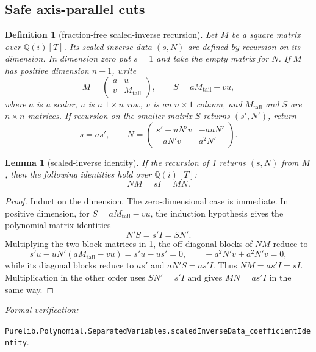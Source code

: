 \documentclass[11pt]{article}
\newtheorem{lemma}[theorem]{Lemma}
\newtheorem{definition}[theorem]{Definition}
\newcommand{\Qi}{\mathbb{Q}(i)}
\newcommand{\leanref}[1]{\par\smallskip\noindent
  \emph{Formal verification:}\par\nobreak
  {\raggedright\nolinkurl{#1}.\par}}
\begin{document}
\subsection{Safe axis-parallel cuts}

\begin{definition}[fraction-free scaled-inverse recursion]
\label{def:fraction-free-scaled-inverse}
Let $M$ be a square matrix over $\Qi[T]$.  Its scaled-inverse data $(s,N)$
are defined by recursion on its dimension.  In dimension zero put $s=1$ and
take the empty matrix for $N$.  If $M$ has positive dimension $n+1$, write
\[
 M=\begin{pmatrix}a&u\\ v&M_{\mathrm{tail}}\end{pmatrix},
 \qquad S=aM_{\mathrm{tail}}-vu,
\]
where $a$ is a scalar, $u$ is a $1\times n$ row, $v$ is an $n\times1$
column, and $M_{\mathrm{tail}}$ and $S$ are $n\times n$ matrices.  If
recursion on the smaller matrix $S$ returns $(s',N')$, return
\[
 s=as',\qquad
 N=\begin{pmatrix}
      s'+uN'v&-auN'\\
      -aN'v&a^2N'
    \end{pmatrix}.
\]
\end{definition}

\begin{lemma}[scaled-inverse identity]
\label{lem:scaled-inverse-identity}
If the recursion of \cref{def:fraction-free-scaled-inverse} returns $(s,N)$
from $M$, then the following identities hold over $\Qi[T]$:
\[
                         NM=sI=MN.
\]
\end{lemma}

\begin{proof}
Induct on the dimension.  The zero-dimensional case is immediate.  In
positive dimension, for $S=aM_{\mathrm{tail}}-vu$, the induction hypothesis
gives the polynomial-matrix identities
\[
                 N'S=s'I=SN'.
\]
Multiplying the two block matrices in
\cref{def:fraction-free-scaled-inverse}, the off-diagonal blocks of $NM$
reduce to
\[
 s'u-uN'(aM_{\mathrm{tail}}-vu)=s'u-us'=0,
 \qquad -a^2N'v+a^2N'v=0,
\]
while its diagonal blocks reduce to $as'$ and $aN'S=as'I$.
Thus $NM=as'I=sI$.  Multiplication in the other order uses $SN'=s'I$ and
gives $MN=as'I$ in the same way.
\end{proof}

\leanref{Purelib.Polynomial.SeparatedVariables.scaledInverseData_coefficientIdentity}
\end{document}

